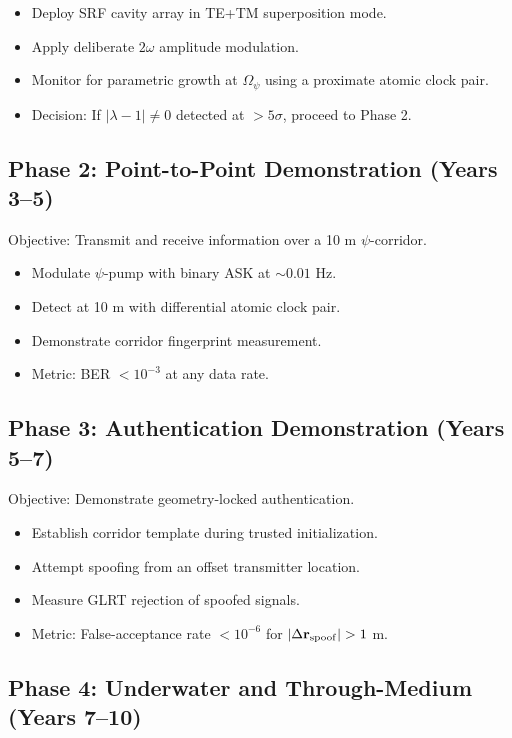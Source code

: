 \documentclass[twocolumn,superscriptaddress,prd,nofootinbib]{revtex4-2}
\begin{document}
\begin{itemize}
\item Deploy SRF cavity array in TE+TM superposition mode.
\item Apply deliberate $2\omega$ amplitude modulation.
\item Monitor for parametric growth at $\Omega_\psi$ using a proximate
atomic clock pair.
\item Decision: If $|\lambda - 1| \neq 0$ detected at
$> 5\sigma$, proceed to Phase 2.
\end{itemize}

\subsection{Phase 2: Point-to-Point Demonstration (Years 3--5)}

Objective: Transmit and receive information over a 10 m $\psi$-corridor.

\begin{itemize}
\item Modulate $\psi$-pump with binary ASK at $\sim 0.01$ Hz.
\item Detect at 10 m with differential atomic clock pair.
\item Demonstrate corridor fingerprint measurement.
\item Metric: BER $< 10^{-3}$ at any data rate.
\end{itemize}

\subsection{Phase 3: Authentication Demonstration (Years 5--7)}

Objective: Demonstrate geometry-locked authentication.

\begin{itemize}
\item Establish corridor template during trusted initialization.
\item Attempt spoofing from an offset transmitter location.
\item Measure GLRT rejection of spoofed signals.
\item Metric: False-acceptance rate $< 10^{-6}$ for
$|\Delta\mathbf{r}_{\rm spoof}| > 1$ m.
\end{itemize}

\subsection{Phase 4: Underwater and Through-Medium (Years 7--10)}
\end{document}
